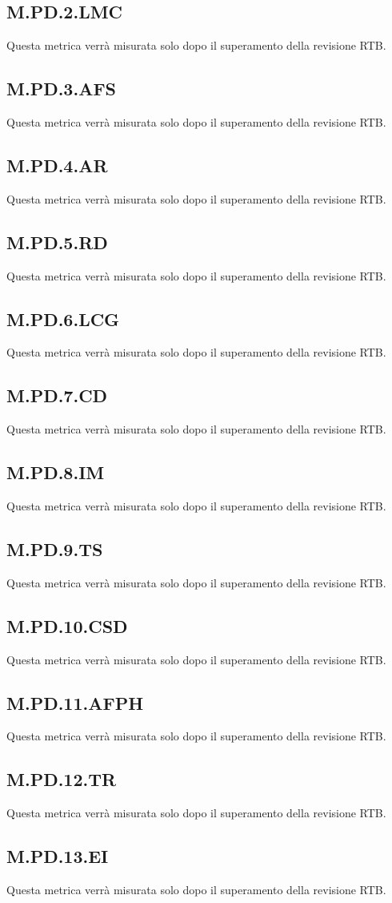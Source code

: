 \subsection{M.PD.2.LMC}
Questa metrica verrà misurata solo dopo il superamento della revisione RTB.
\subsection{M.PD.3.AFS}
Questa metrica verrà misurata solo dopo il superamento della revisione RTB.
\subsection{M.PD.4.AR}
Questa metrica verrà misurata solo dopo il superamento della revisione RTB.
\subsection{M.PD.5.RD}
Questa metrica verrà misurata solo dopo il superamento della revisione RTB.
\subsection{M.PD.6.LCG}
Questa metrica verrà misurata solo dopo il superamento della revisione RTB.
\subsection{M.PD.7.CD}
Questa metrica verrà misurata solo dopo il superamento della revisione RTB.
\subsection{M.PD.8.IM}
Questa metrica verrà misurata solo dopo il superamento della revisione RTB.
\subsection{M.PD.9.TS}
Questa metrica verrà misurata solo dopo il superamento della revisione RTB.
\subsection{M.PD.10.CSD}
Questa metrica verrà misurata solo dopo il superamento della revisione RTB.
\subsection{M.PD.11.AFPH}
Questa metrica verrà misurata solo dopo il superamento della revisione RTB.
\subsection{M.PD.12.TR}
Questa metrica verrà misurata solo dopo il superamento della revisione RTB.
\subsection{M.PD.13.EI}
Questa metrica verrà misurata solo dopo il superamento della revisione RTB.

